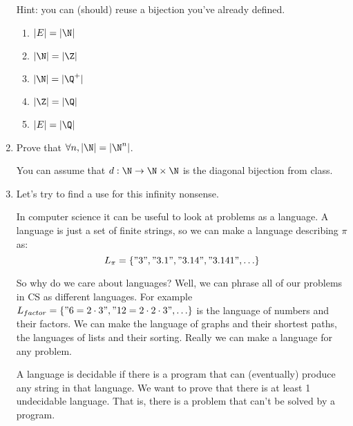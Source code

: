 \documentclass[basic, header]{nosvagor-notes}
\begin{document}
\begin{enumerate}[itemsep=4em]
    Hint: you can (should) reuse a bijection you've already defined.
    \begin{enumerate}[leftmargin=2em]

      \item \(\displaystyle |E| = |\N| \)

      \item \(\displaystyle |\N| = |\Z| \)

      \item \(\displaystyle |\N| = |\Q^+| \)

      \item \(\displaystyle |\Z| = |\Q| \)

      \item \(\displaystyle |E| = |\Q| \)

    \end{enumerate}

  \newpage %

  \item Prove that \(\displaystyle \forall n, |\N| = |\N^n|\).

    You can assume that \(d : \N \to \N \times \N\) is the diagonal bijection
    from class.

  \newpage %

  \item Let's try to find a use for this infinity nonsense.

    In computer science it can be useful to look at problems as a language. A
    language is just a set of finite strings, so we can make a language
    describing $\pi$ as: \[L_\pi = \{"3", "3.1", "3.14", "3.141", \ldots\}\]

    So why do we care about languages?
    Well, we can phrase all of our problems in CS as different languages.
    For example $L_{factor} = \{"6=2\cdot3", "12=2\cdot2\cdot3", \ldots\}$
    is the language of numbers and their factors. We can make the language of
    graphs and their shortest paths, the languages of lists
    and their sorting. Really we can make a language for any problem.

    A language is decidable if there is a program that can (eventually)
    produce any string in that language. We want to prove that there is at
    least 1 undecidable language. That is, there is a problem that can’t be
    solved by a program.


\end{enumerate}
\end{document}
